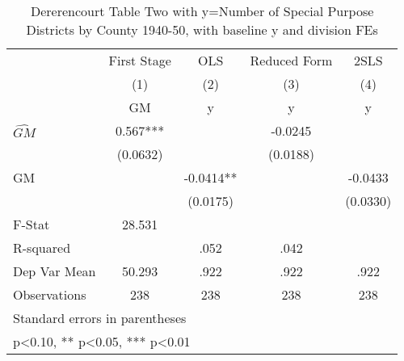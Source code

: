 \begin{table}[htbp]\centering
\def\sym#1{\ifmmode^{#1}\else\(^{#1}\)\fi}
\caption{Dererencourt Table Two with y=Number of Special Purpose Districts by County 1940-50, with baseline y and division FEs}
\begin{tabular}{l*{4}{c}}
\toprule
                    & First Stage   &         OLS   &Reduced Form   &        2SLS   \\
                    &\multicolumn{1}{c}{(1)}&\multicolumn{1}{c}{(2)}&\multicolumn{1}{c}{(3)}&\multicolumn{1}{c}{(4)}\\
                    &\multicolumn{1}{c}{GM}&\multicolumn{1}{c}{y}&\multicolumn{1}{c}{y}&\multicolumn{1}{c}{y}\\
\midrule
$\hat{GM}$          &       0.567***&               &     -0.0245   &               \\
                    &    (0.0632)   &               &    (0.0188)   &               \\
\addlinespace
GM                  &               &     -0.0414** &               &     -0.0433   \\
                    &               &    (0.0175)   &               &    (0.0330)   \\
\midrule
F-Stat              &      28.531   &               &               &               \\
R-squared           &               &        .052   &        .042   &               \\
Dep Var Mean        &      50.293   &        .922   &        .922   &        .922   \\
Observations        &         238   &         238   &         238   &         238   \\
\bottomrule
\multicolumn{5}{l}{\footnotesize Standard errors in parentheses}\\
\multicolumn{5}{l}{\footnotesize * p<0.10, ** p<0.05, *** p<0.01}\\
\end{tabular}
\end{table}
